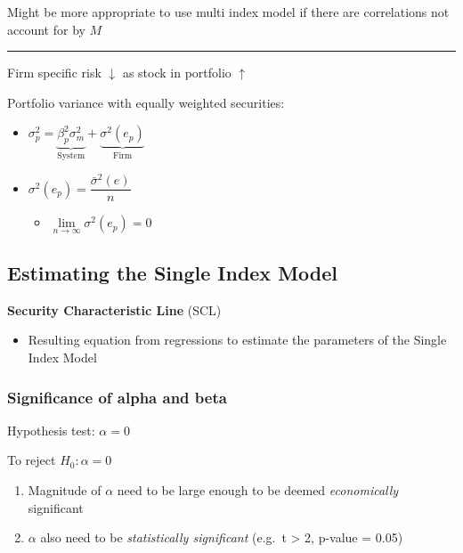 \documentclass[]{book}
\providecommand{\tightlist}{%
  \setlength{\itemsep}{0pt}\setlength{\parskip}{0pt}}
\theoremstyle{definition}
\theoremstyle{definition}
\theoremstyle{remark}
\begin{document}
Might be more appropriate to use multi index model if there are
correlations not account for by \(M\)

\begin{center}\rule{0.5\linewidth}{\linethickness}\end{center}

Firm specific risk \(\downarrow\) as stock in portfolio \(\uparrow\)

Portfolio variance with equally weighted securities:

\begin{itemize}
\item
  \(\sigma^2_p = \underbrace{\beta^2_p \sigma^2_m}_{\text{System}} + \underbrace{\sigma^2(e_p)}_{\text{Firm}}\)
\item
  \(\sigma^2(e_p) = \dfrac{\bar{\sigma}^2(e)}{n}\)

  \begin{itemize}
  \tightlist
  \item
    \(\lim \limits_{n \rightarrow \infty} \sigma^2(e_p) = 0\)
  \end{itemize}
\end{itemize}

\subsection{Estimating the Single Index
Model}\label{estimating-the-single-index-model}

\textbf{Security Characteristic Line} (SCL)

\begin{itemize}
\tightlist
\item
  Resulting equation from regressions to estimate the parameters of the
  Single Index Model
\end{itemize}

\subsubsection{Significance of alpha and
beta}\label{significance-of-alpha-and-beta}

Hypothesis test: \(\alpha = 0\)

To reject \(H_0: \alpha = 0\)

\begin{enumerate}
\def\labelenumi{\arabic{enumi})}
\item
  Magnitude of \(\alpha\) need to be large enough to be deemed
  \emph{economically} significant
\item
  \(\alpha\) also need to be \emph{statistically significant} (e.g.~t
  \textgreater{} 2, p-value = 0.05)
\end{enumerate}
\end{document}
